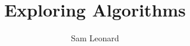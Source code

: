 \documentclass[12pt, a4paper]{third-rep}
\title{Exploring \glsentrylong{pake} Algorithms}
\author{Sam Leonard}
\begin{document}
\dotitleandabstract

\tableofcontents







\printnoidxglossaries{}

%              

       
\nocite{*}

                                
\appendix

\end{document}
